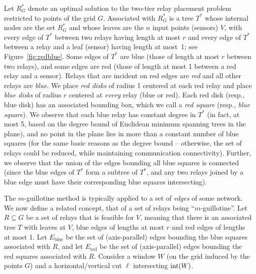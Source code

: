 \documentclass[11pt,a4paper]{article}
\DeclareMathOperator{\interior}{int}
\newcommand{\intW}{\interior(W\mspace{-1mu})}
\newcommand{\blue}{\text{blue}}
\newcommand{\red}{\text{red}}
\theoremstyle{definition}
\theoremstyle{remark}
\begin{document}
Let $R_G^*$ denote an optimal solution to the two-tier relay placement
problem restricted to points of the grid $G$.  Associated with $R_G^*$
is a tree $T^*$ whose internal nodes are the set $R_G^*$ and whose
leaves are the $n$ input points (sensors) $V$, with every edge of
$T^*$ between two relays having length at most $r$ and every edge of
$T^*$ between a relay and a leaf (sensor) having length at most~1; see Figure~\ref{fig:redblue}.
Some edges of $T^*$ are blue (those of length at most $r$ between two
relays), and some edges are red (those of length at most 1 between a
red relay and a sensor).  Relays that are incident on red edges are
{\em red} and all other relays are {\em blue}.  We place {\em red
  disks} of radius 1 centered at each red relay and place {\em blue
  disks} of radius $r$ centered at {\em every} relay (blue or red).
Each red disk (resp., blue disk) has an associated bounding box, which
we call a {\em red square} (resp., {\em blue square}).  We observe
that each blue relay has constant degree in $T^*$ (in fact, at most 5,
based on the degree bound of Euclidean minimum spanning trees in the
plane), and no point in the plane lies in more than a constant number
of blue squares (for the same basic reasons as the degree bound --
otherwise, the set of relays could be reduced, while maintaining
communication connectivity).  Further, we observe that the union of
the edges bounding all blue squares is connected (since the blue edges
of $T^*$ form a subtree of $T^*$, and any two relays joined by a blue
edge must have their corresponding blue squares intersecting).

The $m$-guillotine method is typically applied to a set of {\em edges}
of some network.  We now define a related concept, that of a set of
relays being ``$m$-guillotine''.  Let $R\subseteq G$ be a set of
relays that is feasible for $V$, meaning that there is an associated
tree $T$ with leaves at $V$, blue edges of lengths at most $r$ and red
edges of lengths at most 1.  Let $E_{\blue}$ be the set of (axis-parallel)
edges bounding the blue squares associated with $R$, and let $E_{\red}$ be
the set of (axis-parallel) edges bounding the red squares associated
with $R$.  Consider a window $W$ (on the grid induced by the points
$G$) and a horizontal/vertical cut $\ell$ intersecting $\intW$.
\end{document}
